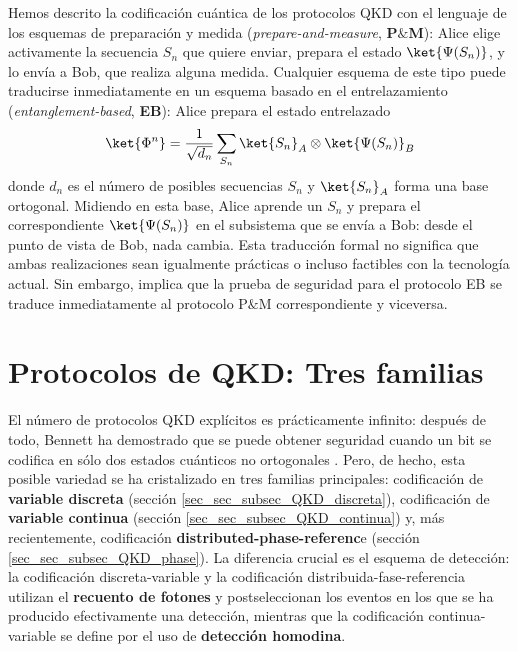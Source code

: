 \documentclass[a4paper,11pt]{book} %
\numberwithin{equation}{chapter}
\begin{document}
Hemos descrito la codificación cuántica de los protocolos QKD con el lenguaje de los esquemas de preparación y medida (\textit{prepare-and-measure}, \textbf{P$\&$M}): Alice elige activamente la secuencia $S_n$ que quiere enviar, prepara el estado $\ket{\Psi(S_n)}$, y lo envía a Bob, que realiza alguna medida. Cualquier esquema de este tipo puede traducirse inmediatamente en un esquema basado en el entrelazamiento (\textit{entanglement-based}, \textbf{EB}): Alice prepara el estado entrelazado
	\begin{equation}
	\ket{\Phi^n} = \frac{1}{\sqrt{d_n}} \sum_{S_n} \ket{S_n}_A \otimes \ket{\Psi(S_n)}_B
	\end{equation}
donde $d_n$ es el número de posibles secuencias $S_n$ y $\ket{S_n}_A$ forma una base ortogonal. Midiendo en esta base, Alice aprende un $S_n$ y prepara el correspondiente $\ket{\Psi(S_n)}$ en el subsistema que se envía a Bob: desde el punto de vista de Bob, nada cambia. Esta traducción formal no significa que ambas realizaciones sean igualmente prácticas o incluso factibles con la tecnología actual. Sin embargo, implica que la prueba de seguridad para el protocolo EB se traduce inmediatamente al protocolo P$\&$M correspondiente y viceversa.
		
	\section{Protocolos de QKD: Tres familias}
	
El número de protocolos QKD explícitos es prácticamente infinito: después de todo, Bennett ha demostrado que se puede obtener seguridad cuando un bit se codifica en sólo dos estados cuánticos no ortogonales \cite{bib_BB84_E91_iguales}. Pero, de hecho, esta posible variedad se ha cristalizado en tres familias principales: codificación de \textbf{variable discreta} (sección \ref{sec_sec_subsec_QKD_discreta}), codificación de \textbf{variable continua} (sección \ref{sec_sec_subsec_QKD_continua}) y, más recientemente, codificación \textbf{distributed-phase-referenc}e (sección \ref{sec_sec_subsec_QKD_phase}). La diferencia crucial es el esquema de detección: la codificación discreta-variable y la codificación distribuida-fase-referencia utilizan el \textbf{recuento de fotones} y postseleccionan los eventos en los que se ha producido efectivamente una detección, mientras que la codificación continua-variable se define por el uso de \textbf{detección homodina}.
\end{document}
